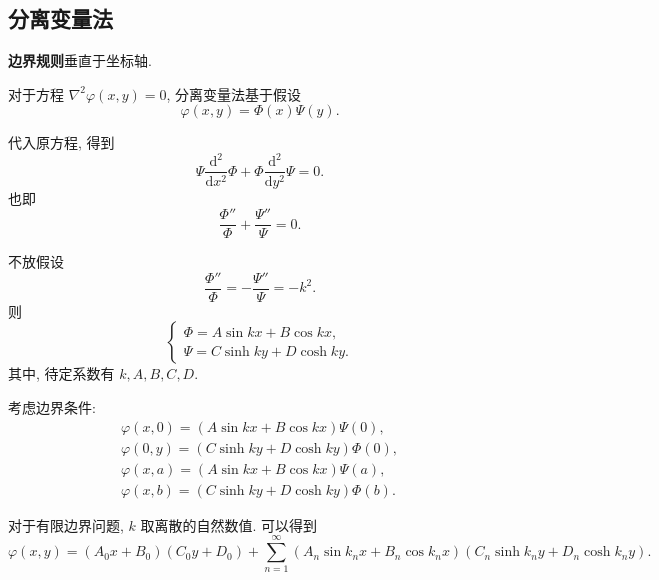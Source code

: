 \subsection{分离变量法}
\textbf{边界规则}\quad 垂直于坐标轴.

对于方程 $\nabla^2\varphi(x,y)=0$, 分离变量法基于假设
\begin{equation}
    \varphi(x,y)=\Phi(x)\Psi(y).
\end{equation}

代入原方程, 得到
\begin{equation}
    \Psi\frac{\mathrm{d}^2}{\mathrm{d}x^2}\Phi+\Phi\frac{\mathrm{d}^2}{\mathrm{d}y^2}\Psi=0.
\end{equation}
也即
\begin{equation}
    \frac{\Phi''}{\Phi}+\frac{\Psi''}{\Psi}=0.
\end{equation}

不放假设
\begin{equation}
    \frac{\Phi''}{\Phi}=-\frac{\Psi''}{\Psi}=-k^2.
\end{equation}
则
\begin{equation}
    \begin{cases}
        \Phi=A\sin kx+B\cos kx, \\
        \Psi=C\sinh ky+D\cosh ky.
    \end{cases}
\end{equation}
其中, 待定系数有 $k,A,B,C,D$.

考虑边界条件:
\begin{gather}
    \varphi(x,0)=(A\sin kx+B\cos kx)\Psi(0), \\
    \varphi(0,y)=(C\sinh ky+D\cosh ky)\Phi(0), \\
    \varphi(x,a)=(A\sin kx+B\cos kx)\Psi(a), \\
    \varphi(x,b)=(C\sinh ky+D\cosh ky)\Phi(b).
\end{gather}

对于有限边界问题, $k$ 取离散的自然数值. 可以得到
\begin{equation}
    \varphi(x,y)=(A_0x+B_0)(C_0y+D_0)+\sum_{n=1}^{\infty}(A_n\sin k_nx+B_n\cos k_nx)(C_n\sinh k_ny+D_n\cosh k_ny).
\end{equation}
